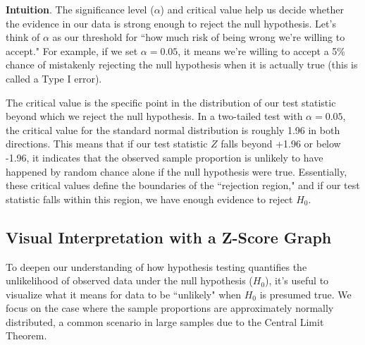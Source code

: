 \documentclass[11pt]{article}
\begin{document}
\textbf{Intuition}. The significance level (\( \alpha \)) and critical value help us decide whether the evidence in our data is strong enough to reject the null hypothesis. Let's think of \( \alpha \) as our threshold for ``how much risk of being wrong we're willing to accept." For example, if we set \( \alpha = 0.05 \), it means we're willing to accept a 5\% chance of mistakenly rejecting the null hypothesis when it is actually true (this is called a Type I error).

The critical value is the specific point in the distribution of our test statistic beyond which we reject the null hypothesis. In a two-tailed test with \( \alpha = 0.05 \), the critical value for the standard normal distribution is roughly 1.96 in both directions. This means that if our test statistic \( Z \) falls beyond +1.96 or below -1.96, it indicates that the observed sample proportion is unlikely to have happened by random chance alone if the null hypothesis were true. Essentially, these critical values define the boundaries of the ``rejection region," and if our test statistic falls within this region, we have enough evidence to reject \( H_0 \).

\subsection*{Visual Interpretation with a Z-Score Graph}

To deepen our understanding of how hypothesis testing quantifies the unlikelihood of observed data under the null hypothesis (\( H_0 \)), it's useful to visualize what it means for data to be ``unlikely" when \( H_0 \) is presumed true. We focus on the case where the sample proportions are approximately normally distributed, a common scenario in large samples due to the Central Limit Theorem.
\end{document}
